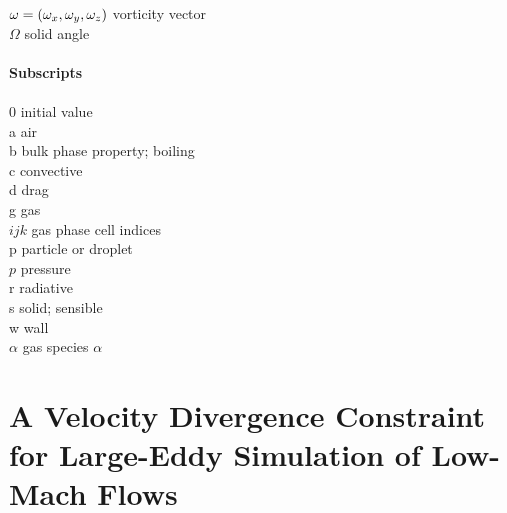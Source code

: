 \begin{tabbing}
${\mathbf{\omega}}=(\omega_x,\omega_y,\omega_z)$    \> vorticity vector \\
$\Omega$                  \> solid angle \\
\hspace{0.1in}            \> \\
{\bf Subscripts}          \> \\
\hspace{0.1in}            \> \\
0                         \> initial value \\
a                         \> air \\
b                         \> bulk phase property; boiling \\
c                         \> convective \\
d                         \> drag \\
g                         \> gas \\
$ijk$                     \> gas phase cell indices \\
p                         \> particle or droplet \\
$p$                       \> pressure \\
r                         \> radiative \\
s                         \> solid; sensible \\
w                         \> wall \\
$\alpha$                  \> gas species $\alpha$ \\
\end{tabbing}





\chapter{A Velocity Divergence Constraint for Large-Eddy Simulation of Low-Mach Flows}
\label{app_divergence}

